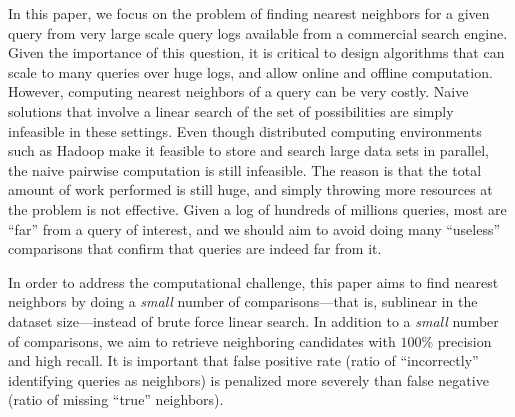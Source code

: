 In this paper, we focus on the problem of finding nearest neighbors
for a given query from very large scale query logs available from a commercial search engine. 
Given the importance of this question, it is critical to design
algorithms that can scale to many queries over huge logs, and allow
online and offline computation. 
However, computing nearest neighbors of a query 
can be very costly. 
Naive solutions that involve a linear search of the set of possibilities
are simply infeasible in these settings. 
Even though distributed computing environments such as Hadoop
make it feasible to store and search large data sets in parallel, 
the naive pairwise computation is still infeasible. 
The reason is that the total amount of work performed is still huge,
and simply throwing more resources at the problem is not effective. 
Given a log of hundreds of millions queries, most are ``far'' from a
query of interest, and we should aim to avoid doing many ``useless''
comparisons that confirm that queries are indeed far from it. 

In order to address the computational challenge, this paper aims to find nearest neighbors by doing a 
\emph{small} number of comparisons---that is, sublinear in the dataset size---instead of brute force linear search. 
In addition to a \emph{small} number of comparisons, we aim to 
retrieve neighboring candidates with  $100\%$ precision and high recall.
It is important that false positive rate (ratio of  ``incorrectly'' identifying queries as neighbors) 
is penalized more severely than false negative (ratio of missing ``true'' neighbors).

